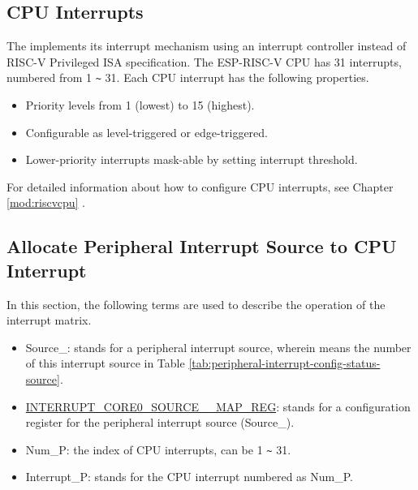\documentclass[main\_\_EN.tex]{subfiles}
\begin{document}
\subsection{CPU Interrupts}

The \chipname{} implements its interrupt mechanism using an interrupt controller instead of RISC-V Privileged ISA specification. The ESP-RISC-V CPU has 31 interrupts, numbered from 1 \verb+~+ 31. Each CPU interrupt has the following properties. 
\begin{itemize}
    \item Priority levels from 1 (lowest) to 15 (highest).
    \item Configurable as level-triggered or edge-triggered.
    \item Lower-priority interrupts mask-able by setting interrupt threshold.
\end{itemize}

\begin{tiplisting}
For detailed information about how to configure CPU interrupts, see Chapter \ref{mod:riscvcpu} \textit{}. 
\end{tiplisting}



\subsection{Allocate Peripheral Interrupt Source to CPU Interrupt}

In this section, the following terms are used to describe the operation of the interrupt matrix.

\begin{itemize}

\item Source\_: stands for a peripheral interrupt source, wherein  means the number of this interrupt source in Table \ref{tab:peripheral-interrupt-config-status-source}.

\item \hyperref[regdesc:INTERRUPTCORE0CACHECORE0ACSINTMAPREG]{INTERRUPT\_CORE0\_SOURCE\_\_MAP\_REG}: stands for a configuration register for the peripheral interrupt source (Source\_).

\item Num\_P: the index of CPU interrupts, can be 1 \verb+~+ 31.

\item Interrupt\_P: stands for the CPU interrupt numbered as Num\_P.
\end{itemize}
\end{document}
